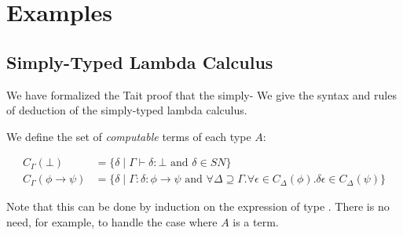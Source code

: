 \documentclass[envcountsame]{llncs}
\begin{document}
% 
% 
% 
% 

\section{Examples}

\subsection{Simply-Typed Lambda Calculus}

We have formalized the Tait proof that the simply-
We give the syntax and rules of deduction of the simply-typed lambda calculus.


We define the set of \emph{computable} terms of each type $A$:

\begin{align*}
C_\Gamma(\bot) & = \{ \delta \mid \Gamma \vdash \delta : \bot \text{ and } \delta \in SN \} \\
C_\Gamma(\phi \rightarrow \psi) & = \{ \delta \mid \Gamma : \delta : \phi \rightarrow \psi \text{ and } \forall \Delta ⊇ \Gamma . ∀ \epsilon \in C_\Delta(\phi). \delta \epsilon \in C_\Delta(\psi) \}
\end{align*}


Note that this can be done by induction on the expression of type .  There is no need, for example, to handle the case where $A$ is a term.
\end{document}
